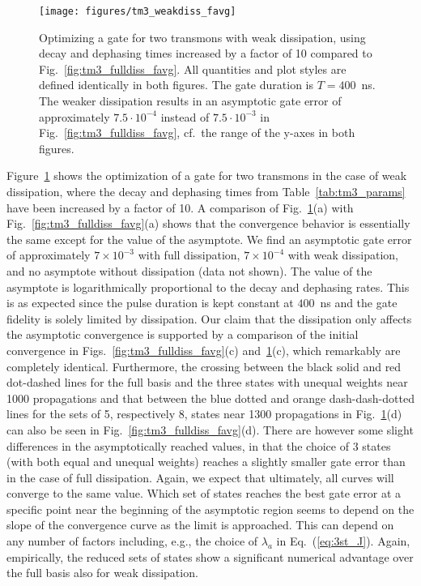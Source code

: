 \begin{figure}[tb] %
  \centering
 \texttt{[image: figures/tm3\_weakdiss\_favg]}
 \caption{Optimizing a \sqrtISWAP{} gate for two transmons with weak
   dissipation, using decay and dephasing times increased by a factor of 10
   compared to Fig.~\ref{fig:tm3_fulldiss_favg}. All quantities and
   plot styles are defined identically in both figures. The gate duration
   is $T=400$~ns.  The weaker dissipation results in an asymptotic gate error of
   approximately $7.5\cdot10^{-4}$ instead of $7.5\cdot10^{-3}$ in
   Fig.~\ref{fig:tm3_fulldiss_favg}, cf.\ the range of the y-axes in
   both figures.
   }
 \label{fig:tm3_weakdiss_favg}
\end{figure}
Figure~\ref{fig:tm3_weakdiss_favg} shows the optimization of
a \sqrtISWAP{} gate for two transmons in the
case of weak dissipation, where the decay and dephasing times from
Table~\ref{tab:tm3_params} have been increased by a factor of 10. A comparison of
Fig.~\ref{fig:tm3_weakdiss_favg}(a) with
Fig.~\ref{fig:tm3_fulldiss_favg}(a) shows that the
convergence
behavior is essentially the same except for the value of the asymptote. We find
an asymptotic gate error of approximately $7 \times 10^{-3}$ with full
dissipation, $7 \times 10^{-4}$ with weak dissipation, and no asymptote without
dissipation (data not shown). The value of the asymptote is logarithmically
proportional to the decay and dephasing rates. This is as expected
since the pulse duration is kept constant at $400$~ns and the gate
fidelity is solely limited by
dissipation. Our claim that the dissipation only affects the asymptotic
convergence is supported by a comparison of the initial convergence
in Figs.~\ref{fig:tm3_fulldiss_favg}(c)
and~\ref{fig:tm3_weakdiss_favg}(c),
which remarkably are completely identical.
Furthermore, the crossing between the black solid and red dot-dashed lines for
the full basis and the three states with unequal weights near 1000 propagations
and that between the blue dotted and orange dash-dash-dotted lines for the sets
of 5, respectively 8, states near
1300 propagations in Fig.~\ref{fig:tm3_weakdiss_favg}(d) can
also be seen in Fig.~\ref{fig:tm3_fulldiss_favg}(d).
There are however some slight differences in the asymptotically reached values,
in that the choice of 3 states (with both equal and unequal weights) reaches a slightly
smaller gate error than in the case of full dissipation. Again, we expect that
ultimately, all curves will converge to the same value. Which set of states
reaches the best gate error at a specific point near the beginning of the
asymptotic region seems to depend on the slope of the convergence curve as the
limit is approached. This can depend on any number of factors
including, e.g., the choice
of $\lambda_a$ in Eq.~(\ref{eq:3st_J}). Again, empirically, the reduced sets of
states show a significant numerical advantage over the full basis also
for weak dissipation.

